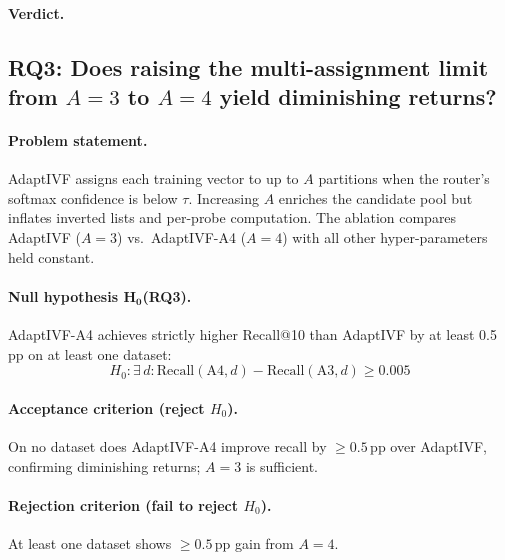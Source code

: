 \paragraph{Verdict.}

\subsection{RQ3: Does raising the multi-assignment limit from $A\!=\!3$ to $A\!=\!4$ yield diminishing returns?}
\label{sec:appendix:rq3}

\paragraph{Problem statement.}
AdaptIVF assigns each training vector to up to $A$ partitions when the
router's softmax confidence is below $\tau$.  Increasing $A$ enriches the
candidate pool but inflates inverted lists and per-probe computation.  The
ablation compares AdaptIVF ($A\!=\!3$) vs.\ AdaptIVF-A4 ($A\!=\!4$) with all
other hyper-parameters held constant.

\paragraph{Null hypothesis $\boldsymbol{H_0}$(RQ3).}
AdaptIVF-A4 achieves strictly higher Recall@10 than AdaptIVF by at least
0.5\,pp on at least one dataset:
\[
  H_0: \exists\, d : \text{Recall}(\text{A4}, d) - \text{Recall}(\text{A3}, d) \geq 0.005
\]

\paragraph{Acceptance criterion (reject $H_0$).}
On no dataset does AdaptIVF-A4 improve recall by $\geq 0.5$\,pp over
AdaptIVF, confirming diminishing returns; $A\!=\!3$ is sufficient.

\paragraph{Rejection criterion (fail to reject $H_0$).}
At least one dataset shows $\geq 0.5$\,pp gain from $A\!=\!4$.

